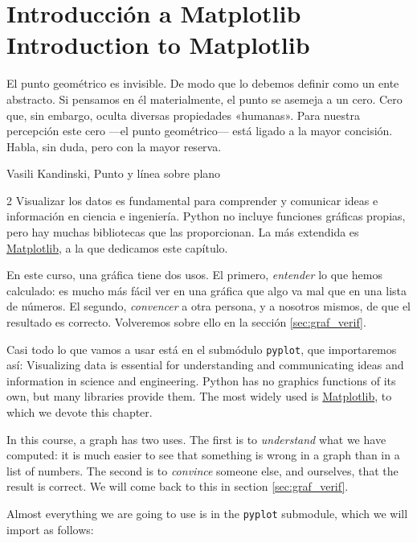 \chapter{Introducción a Matplotlib\\ Introduction to Matplotlib}\label{ch:matplotlib}
\sloppy
\epigraph{El punto geométrico es invisible. De modo que lo debemos definir como un ente abstracto. Si pensamos en él materialmente, el punto se asemeja a un cero.
Cero que, sin embargo, oculta diversas propiedades «humanas». Para nuestra percepción este cero ---el punto geométrico--- está ligado a la mayor concisión. Habla, sin duda, pero con la mayor reserva.}{Vasili Kandinski, Punto y línea sobre plano}
\begin{paracol}{2}
Visualizar los datos es fundamental para comprender y comunicar ideas e información en ciencia e ingeniería. Python no incluye funciones gráficas propias, pero hay muchas bibliotecas que las proporcionan. La más extendida es \href{https://matplotlib.org/stable/}{Matplotlib}, a la que dedicamos este capítulo.

En este curso, una gráfica tiene dos usos. El primero, \emph{entender} lo que hemos calculado: es mucho más fácil ver en una gráfica que algo va mal que en una lista de números. El segundo, \emph{convencer} a otra persona, y a nosotros mismos, de que el resultado es correcto. Volveremos sobre ello en la sección \ref{sec:graf_verif}.

Casi todo lo que vamos a usar está en el submódulo \texttt{pyplot}, que importaremos así:
\switchcolumn
Visualizing data is essential for understanding and communicating ideas and information in science and engineering. Python has no graphics functions of its own, but many libraries provide them. The most widely used is \href{https://matplotlib.org/stable/}{Matplotlib}, to which we devote this chapter.

In this course, a graph has two uses. The first is to \emph{understand} what we have computed: it is much easier to see that something is wrong in a graph than in a list of numbers. The second is to \emph{convince} someone else, and ourselves, that the result is correct. We will come back to this in section \ref{sec:graf_verif}.

Almost everything we are going to use is in the \texttt{pyplot} submodule, which we will import as follows:
\end{paracol}

